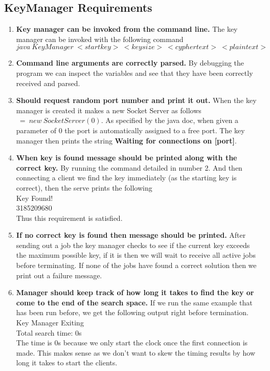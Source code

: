 \documentclass[a4paper, 12pt]{article}
\begin{document}
		\subsection{KeyManager Requirements}
			\begin{enumerate}
				\item \textbf{Key manager can be invoked from the command line.} The key manager can be invoked with the following command $java\ KeyManager\ <start key>\ <key size>\ <cypher text>\ <plain text>$
				
				\item \textbf{Command line arguments are correctly parsed.} By debugging the program we can inspect the variables and see that they have been correctly received and parsed.

				
				\item \textbf{Should request random port number and print it out.} When the key manager is created it makes a new Socket Server as follows $\ =\ new\ SocketServer(0)$. As specified by the java doc, when given a parameter of 0 the port is automatically assigned to a free port. The key manager then prints the string \textbf{Waiting for connections on [port]}.
				
				\item \textbf{When key is found message should be printed along with the correct key.} By running the command detailed in number 2. And then connecting a client we find the key immediately (as the starting key is correct), then the serve prints the following\\
				
				Key Found!\\
				3185209680\\

				Thus this requirement is satisfied.
				
				\item \textbf{If no correct key is found then message should be printed.} After sending out a job the key manager checks to see if the current key exceeds the maximum possible key, if it is then we will wait to receive all active jobs before terminating. If none of the jobs have found a correct solution then we print out a failure message.
				
				\item \textbf{Manager should keep track of how long it takes to find the key or come to the end of the search space.} If we run the same example that has been run before, we get the following output right before termination.\\
				
				Key Manager Exiting\\
				Total search time: 0s\\
				
				The time is 0s because we only start the clock once the first connection is made. This makes sense as we don't want to skew the timing results by how long it takes to start the clients.
					
			\end{enumerate}						
			
\end{document}

